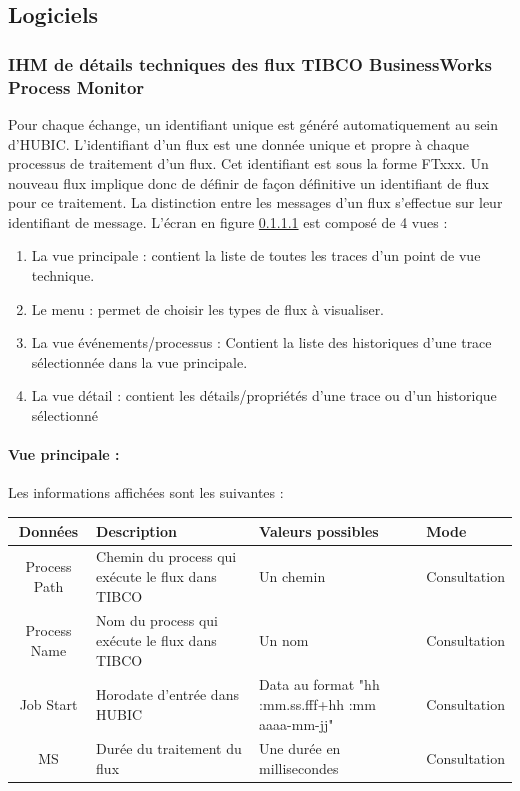 \subsection{Logiciels}
\subsubsection{IHM de détails techniques des flux TIBCO BusinessWorks Process Monitor}
Pour chaque échange, un identifiant unique est généré automatiquement au sein d'HUBIC.
L'identifiant d'un flux est une donnée unique et propre à chaque processus de traitement d'un
flux. Cet identifiant est sous la forme FTxxx. Un nouveau flux implique donc de définir de façon
définitive un identifiant de flux pour ce traitement.
La distinction entre les messages d'un flux s'effectue sur leur identifiant de message.
L'écran en figure \ref{} est composé de 4 vues :
\begin{enumerate}
	\item La vue principale : contient la liste de toutes les traces d'un point de vue technique.
	 \item Le menu : permet de choisir les types de flux à visualiser. \item La vue événements/processus : Contient la liste des historiques d'une trace sélectionnée dans la vue principale. \item La vue détail : contient les détails/propriétés d'une trace ou d'un historique sélectionné
\end{enumerate}
\paragraph{Vue principale : }
Les informations affichées sont les suivantes :\\
\noindent
\begin{tabularx}{\textwidth}{|c|M{4cm}|X|M{4cm}|}
	\hline
	Données& Description& Valeurs possibles& Mode\\\hline\hline
	Process Path&
	Chemin du process qui exécute le flux dans TIBCO&
	Un chemin& Consultation\\
	\hline
	Process Name&
	Nom du process qui exécute le flux dans TIBCO&
	Un nom& Consultation\\
	\hline
	Job Start&
	Horodate d'entrée dans HUBIC&
	Data au format "hh :mm.ss.fff+hh :mm aaaa-mm-jj"&
	Consultation\\
	\hline
	MS&
	Durée du traitement du flux&
	Une durée en millisecondes& Consultation\\
	\hline
\end{tabularx}
